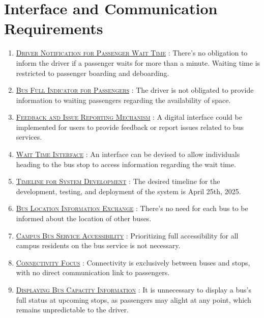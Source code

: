 \section{Interface and Communication Requirements}

\begin{enumerate}
    \item {}\underline{\textsc{Driver Notification for Passenger Wait Time}} : There's no obligation to inform the driver if a passenger waits for more than a minute. Waiting time is restricted to passenger boarding and deboarding.
    
    \item \underline{\textsc{Bus Full Indicator for Passengers}} : The driver is not obligated to provide information to waiting passengers regarding the availability of space.
    
    \item \underline{\textsc{Feedback and Issue Reporting Mechanism}} : A digital interface could be implemented for users to provide feedback or report issues related to bus services.
    
    \item \underline{\textsc{Wait Time Interface}} : An interface can be devised to allow individuals heading to the bus stop to access information regarding the wait time.
    
    \item \underline{\textsc{Timeline for System Development}} : The desired timeline for the development, testing, and deployment of the system is April 25th, 2025.
    
    \item \underline{\textsc{Bus Location Information Exchange}} : There's no need for each bus to be informed about the location of other buses.
    
    \item \underline{\textsc{Campus Bus Service Accessibility}} : Prioritizing full accessibility for all campus residents on the bus service is not necessary.
    
    \item \underline{\textsc{Connectivity Focus}} : Connectivity is exclusively between buses and stops, with no direct communication link to passengers.
    
    \item \underline{\textsc{Displaying Bus Capacity Information}} : It is unnecessary to display a bus's full status at upcoming stops, as passengers may alight at any point, which remains unpredictable to the driver.
\end{enumerate}